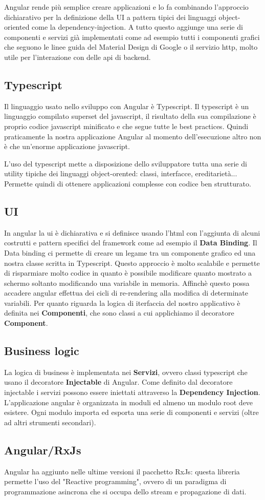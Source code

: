 Angular rende più semplice creare applicazioni e lo fa combinando l'approccio dichiarativo per la definizione della UI a pattern tipici dei linguaggi object-oriented come la dependency-injection.
A tutto questo aggiunge una serie di componenti e servizi già implementati come ad esempio tutti i componenti grafici che seguono le linee guida del Material Design di Google o il servizio http, molto utile per l'interazione con delle api di backend.

\subsection{Typescript}
Il linguaggio usato nello sviluppo con Angular è Typescript. Il typescript è un linguaggio compilato superset del javascript, il risultato della sua compilazione è proprio codice javascript minificato e che segue tutte le best practices.
Quindi praticamente la nostra applicazione Angular al momento dell'esecuzione altro non è che un'enorme applicazione javascript.

L'uso del typescript mette a disposizione dello sviluppatore tutta una serie di utility tipiche dei linguaggi object-orented: classi, interfacce, ereditarietà...
Permette quindi di ottenere applicazioni complesse con codice ben strutturato.

\subsection{UI}
In angular la ui è dichiarativa e si definisce usando l'html con l'aggiunta di alcuni costrutti e pattern specifici del framework come ad esempio il {\bfseries Data Binding}.
Il Data binding ci permette di creare un legame tra un componente grafico ed una nostra classe scritta in Typescript.
Questo approccio è molto scalabile e permette di risparmiare molto codice in quanto è possibile modificare quanto mostrato a schermo soltanto modificando una variabile in memoria.
Affinchè questo possa accadere angular effettua dei cicli di re-rendering alla modifica di determinate variabili.
Per quanto riguarda la logica di iterfaccia del nostro applicativo è definita nei {\bfseries Componenti}, che sono classi a cui applichiamo il decoratore {\bfseries Component}.

\subsection{Business logic}
La logica di business è implementata nei {\bfseries Servizi}, ovvero classi typescript che usano il decoratore {\bfseries Injectable} di Angular.
Come definito dal decoratore injectable i servizi possono essere iniettati attraverso la {\bfseries Dependency Injection}.
L'applicazione angular è organizzata in moduli ed almeno un modulo root deve esistere. Ogni modulo importa ed esporta una serie di componenti e servizi (oltre ad altri strumenti secondari).

\subsection{Angular/RxJs}
Angular ha aggiunto nelle ultime versioni il pacchetto RxJs: questa libreria permette l'uso del "Reactive programming", ovvero di un paradigma di programmazione asincrona che si occupa dello stream e propagazione di dati.
